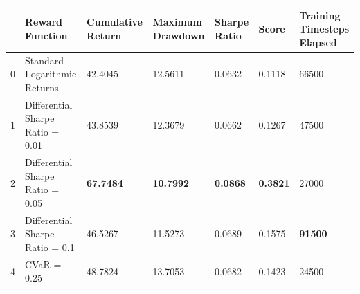 \begin{tabular}{lllllll}
\toprule
 & Reward Function & Cumulative Return & Maximum Drawdown & Sharpe Ratio & Score & Training Timesteps Elapsed \\
\midrule
0 & Standard Logarithmic Returns & 42.4045 & 12.5611 & 0.0632 & 0.1118 & 66500 \\
1 & Differential Sharpe Ratio = 0.01 & 43.8539 & 12.3679 & 0.0662 & 0.1267 & 47500 \\
2 & Differential Sharpe Ratio = 0.05 & \textbf{67.7484} & \textbf{10.7992} & \textbf{0.0868} & \textbf{0.3821} & 27000 \\
3 & Differential Sharpe Ratio = 0.1 & 46.5267 & 11.5273 & 0.0689 & 0.1575 & \textbf{91500} \\
4 & CVaR = 0.25 & 48.7824 & 13.7053 & 0.0682 & 0.1423 & 24500 \\
\bottomrule
\end{tabular}
